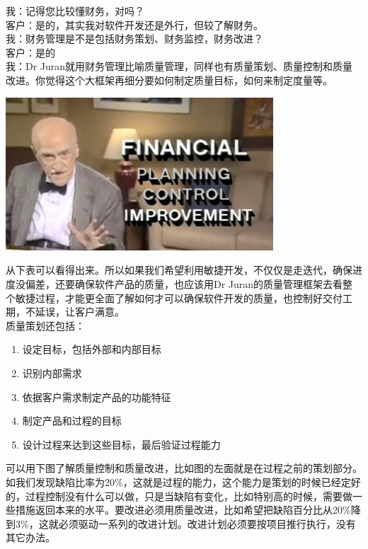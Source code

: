 \documentclass{book}        %
\providecommand{\tightlist}{%
  \setlength{\itemsep}{0pt}\setlength{\parskip}{0pt}}
\begin{document}
我：记得您比较懂财务，对吗？\\
客户：是的，其实我对软件开发还是外行，但较了解财务。\\
我：财务管理是不是包括财务策划、财务监控，财务改进？\\
客户：是的\\
我：Dr
Juran就用财务管理比喻质量管理，同样也有质量策划、质量控制和质量改进。你觉得这个大框架再细分要如何制定质量目标，如何来制定度量等。


\includegraphics[width=10cm]{finAnalogyScreenshot20221007212149.jpg}

从下表可以看得出来。所以如果我们希望利用敏捷开发，不仅仅是走迭代，确保进度没偏差，还要确保软件产品的质量，也应该用Dr
Juran的质量管理框架去看整个敏捷过程，才能更全面了解如何才可以确保软件开发的质量，也控制好交付工期，不延误，让客户满意。\\
质量策划还包括：

\begin{enumerate}
\tightlist
\item
  设定目标，包括外部和内部目标
\item
  识别内部需求
\item
  依据客户需求制定产品的功能特征
\item
  制定产品和过程的目标
\item
  设计过程来达到这些目标，最后验证过程能力\\
\end{enumerate}

可以用下图了解质量控制和质量改进，比如图的左面就是在过程之前的策划部分。如我们发现缺陷比率为20\%，这就是过程的能力，这个能力是策划的时候已经定好的，过程控制没有什么可以做，只是当缺陷有变化，比如特别高的时候，需要做一些措施返回本来的水平。要改进必须用质量改进，比如希望把缺陷百分比从20\%降到3\%，这就必须驱动一系列的改进计划。改进计划必须要按项目推行执行，没有其它办法。\\
\end{document}
